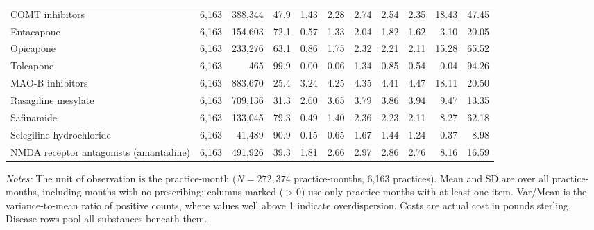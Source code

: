 \begin{table}[htbp]
\begin{adjustbox}{max width=\textwidth}
\begin{tabular}{lrrrrrrrrrr}
\hspace{1em}COMT inhibitors & 6,163 & 388,344 & 47.9 & 1.43 & 2.28 & 2.74 & 2.54 & 2.35 & 18.43 & 47.45 \\
\hspace{2em}Entacapone & 6,163 & 154,603 & 72.1 & 0.57 & 1.33 & 2.04 & 1.82 & 1.62 & 3.10 & 20.05 \\
\hspace{2em}Opicapone & 6,163 & 233,276 & 63.1 & 0.86 & 1.75 & 2.32 & 2.21 & 2.11 & 15.28 & 65.52 \\
\hspace{2em}Tolcapone & 6,163 & 465 & 99.9 & 0.00 & 0.06 & 1.34 & 0.85 & 0.54 & 0.04 & 94.26 \\
\hspace{1em}MAO-B inhibitors & 6,163 & 883,670 & 25.4 & 3.24 & 4.25 & 4.35 & 4.41 & 4.47 & 18.11 & 20.50 \\
\hspace{2em}Rasagiline mesylate & 6,163 & 709,136 & 31.3 & 2.60 & 3.65 & 3.79 & 3.86 & 3.94 & 9.47 & 13.35 \\
\hspace{2em}Safinamide & 6,163 & 133,045 & 79.3 & 0.49 & 1.40 & 2.36 & 2.23 & 2.11 & 8.27 & 62.18 \\
\hspace{2em}Selegiline hydrochloride & 6,163 & 41,489 & 90.9 & 0.15 & 0.65 & 1.67 & 1.44 & 1.24 & 0.37 & 8.98 \\
\hspace{1em}NMDA receptor antagonists (amantadine) & 6,163 & 491,926 & 39.3 & 1.81 & 2.66 & 2.97 & 2.86 & 2.76 & 8.16 & 16.59 \\
\bottomrule
\end{tabular}
\end{adjustbox}
\par\vspace{4pt}
{\footnotesize \textit{Notes:} The unit of observation is the practice-month ($N=272,374$ practice-months, 6,163 practices). Mean and SD are over all practice-months, including months with no prescribing; columns marked ($>0$) use only practice-months with at least one item. Var/Mean is the variance-to-mean ratio of positive counts, where values well above 1 indicate overdispersion. Costs are actual cost in pounds sterling. Disease rows pool all substances beneath them.\par}
\end{table}

